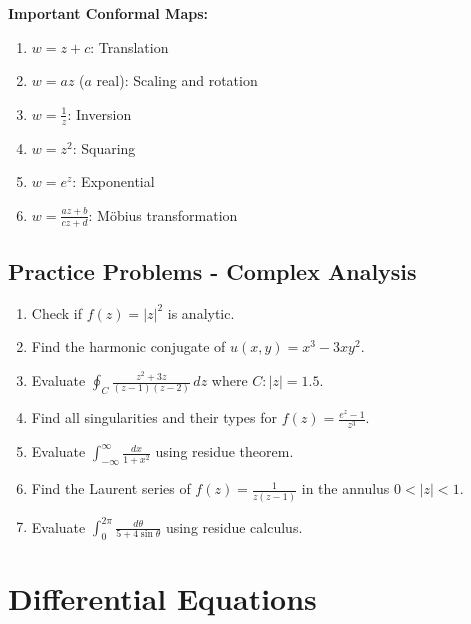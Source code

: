 \documentclass[12pt,a4paper]{article}
\theoremstyle{definition}
\begin{document}
\begin{importantbox}
\textbf{Important Conformal Maps:}
\begin{enumerate}
    \item $w = z + c$: Translation
    \item $w = az$ ($a$ real): Scaling and rotation
    \item $w = \frac{1}{z}$: Inversion
    \item $w = z^2$: Squaring
    \item $w = e^z$: Exponential
    \item $w = \frac{az + b}{cz + d}$: Möbius transformation
\end{enumerate}
\end{importantbox}

\subsection{Practice Problems - Complex Analysis}

\begin{enumerate}
    \item Check if $f(z) = |z|^2$ is analytic.
    
    \item Find the harmonic conjugate of $u(x,y) = x^3 - 3xy^2$.
    
    \item Evaluate $\oint_C \frac{z^2 + 3z}{(z - 1)(z - 2)}\,dz$ where $C: |z| = 1.5$.
    
    \item Find all singularities and their types for $f(z) = \frac{e^z - 1}{z^3}$.
    
    \item Evaluate $\int_{-\infty}^{\infty} \frac{dx}{1 + x^2}$ using residue theorem.
    
    \item Find the Laurent series of $f(z) = \frac{1}{z(z-1)}$ in the annulus $0 < |z| < 1$.
    
    \item Evaluate $\int_0^{2\pi} \frac{d\theta}{5 + 4\sin\theta}$ using residue calculus.
\end{enumerate}

\newpage
\section{Differential Equations}
\end{document}
